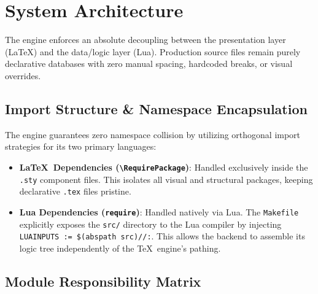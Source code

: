 \section{System Architecture}

The engine enforces an absolute decoupling between the presentation layer (\LaTeX) and the data/logic layer (Lua). Production source files remain purely declarative databases with zero manual spacing, hardcoded breaks, or visual overrides.

\subsection{Import Structure \& Namespace Encapsulation}
The engine guarantees zero namespace collision by utilizing orthogonal import strategies for its two primary languages:
\begin{itemize}
    \item \textbf{\LaTeX\ Dependencies (\texttt{\textbackslash RequirePackage})}: Handled exclusively inside the \texttt{.sty} component files. This isolates all visual and structural packages, keeping declarative \texttt{.tex} files pristine.
    \item \textbf{Lua Dependencies (\texttt{require})}: Handled natively via Lua. The \texttt{Makefile} explicitly exposes the \texttt{src/} directory to the Lua compiler by injecting \texttt{LUAINPUTS := \$(abspath src)//:}. This allows the backend to assemble its logic tree independently of the \TeX\ engine's pathing.
\end{itemize}

\subsection{Module Responsibility Matrix}

